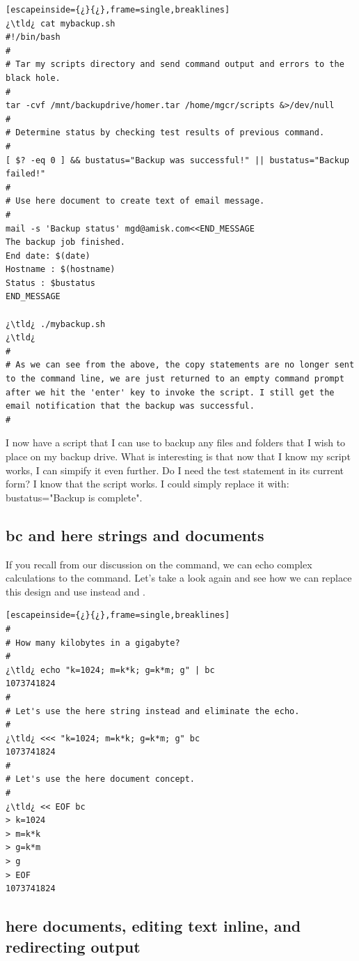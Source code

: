 \begin{lstlisting}[escapeinside={¿}{¿},frame=single,breaklines]
¿\tld¿ cat mybackup.sh
#!/bin/bash 
#
# Tar my scripts directory and send command output and errors to the black hole.
#
tar -cvf /mnt/backupdrive/homer.tar /home/mgcr/scripts &>/dev/null 
#
# Determine status by checking test results of previous command.
#
[ $? -eq 0 ] && bustatus="Backup was successful!" || bustatus="Backup failed!"
#
# Use here document to create text of email message.
#
mail -s 'Backup status' mgd@amisk.com<<END_MESSAGE
The backup job finished.
End date: $(date)
Hostname : $(hostname)
Status : $bustatus
END_MESSAGE

¿\tld¿ ./mybackup.sh
¿\tld¿
# 
# As we can see from the above, the copy statements are no longer sent to the command line, we are just returned to an empty command prompt after we hit the 'enter' key to invoke the script. I still get the email notification that the backup was successful.
#
\end{lstlisting}

I now have a script that I can use to backup any files and folders that I wish to place on my backup drive. What is interesting is that now that I know my script works, I can simpify it even further. Do I need the test statement in its current form? I know that the script works. I could simply replace it with: bustatus="Backup is complete". 

\subsection{bc and here strings and documents}

If you recall from our discussion on the  command, we can echo complex calculations to the  command. Let's take a look again and see how we can replace this design and use instead  and .

\begin{lstlisting}[escapeinside={¿}{¿},frame=single,breaklines]
#
# How many kilobytes in a gigabyte?
#
¿\tld¿ echo "k=1024; m=k*k; g=k*m; g" | bc
1073741824
#
# Let's use the here string instead and eliminate the echo.
#
¿\tld¿ <<< "k=1024; m=k*k; g=k*m; g" bc
1073741824
#
# Let's use the here document concept.
#
¿\tld¿ << EOF bc
> k=1024
> m=k*k
> g=k*m
> g
> EOF
1073741824	
\end{lstlisting}

\subsection{here documents, editing text inline, and redirecting output}

